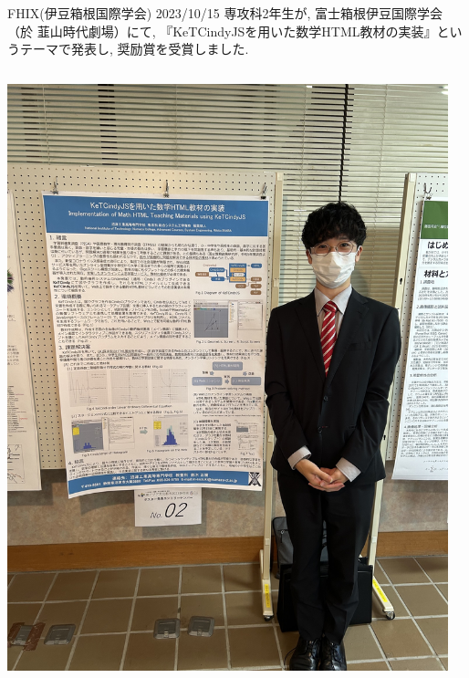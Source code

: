 \documentclass[dvipdfmx, unicode]{beamer}
\begin{document}
\begin{frame}[t]{FHIX(伊豆箱根国際学会) 2023/10/15}
  専攻科2年生が, 富士箱根伊豆国際学会（於 韮山時代劇場）にて,
  『KeTCindyJSを用いた数学HTML教材の実装』というテーマで発表し, 奨励賞を受賞しました.
  \begin{columns}[T]
    \begin{column}{0.5\linewidth}
      \centering
      \includegraphics[scale=0.05]{img/ActiveReport/20231015_p.png}
    \end{column}
    \begin{column}{0.5\linewidth}
      \centering

\end{column}
\end{columns}
\end{frame}
\end{document}
